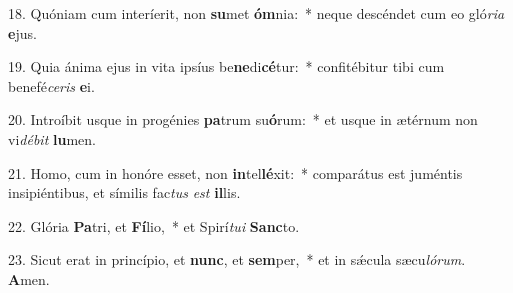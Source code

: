 18. Quóniam cum interíerit, non \textbf{su}met \textbf{óm}nia:~*  neque descéndet cum eo gló\textit{ri}\textit{a} \textbf{e}jus.\

19. Quia ánima ejus in vita ipsíus be\textbf{ne}di\textbf{cé}tur:~*  confitébitur tibi cum benefé\textit{ce}\textit{ris} \textbf{e}i.\

20. Introíbit usque in progénies \textbf{pa}trum su\textbf{ó}rum:~*  et usque in ætérnum non vi\textit{dé}\textit{bit} \textbf{lu}men.\

21. Homo, cum in honóre esset, non \textbf{in}tel\textbf{lé}xit:~*  comparátus est juméntis insipiéntibus, et símilis fac\textit{tus} \textit{est} \textbf{il}lis.\

22. Glória \textbf{Pa}tri, et \textbf{Fí}lio,~*  et Spirí\textit{tu}\textit{i} \textbf{Sanc}to.\

23. Sicut erat in princípio, et \textbf{nunc}, et \textbf{sem}per,~*  et in sǽcula sæcu\textit{ló}\textit{rum}. \textbf{A}men.\

